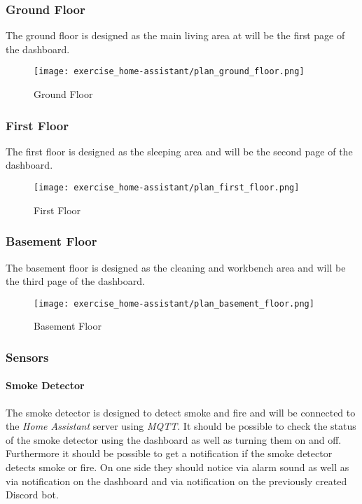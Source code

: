 \subsubsection{Ground Floor}
The ground floor is designed as the main living area at will be the first page of the dashboard.

\begin{figure}[H]
    \centering
    \texttt{[image: exercise\_home-assistant/plan\_ground\_floor.png]}
    \caption{Ground Floor}
    \label{fig:ground_floor}
\end{figure}

\subsubsection{First Floor}
The first floor is designed as the sleeping area and will be the second page of the dashboard.

\begin{figure}[H]
    \centering
    \texttt{[image: exercise\_home-assistant/plan\_first\_floor.png]}
    \caption{First Floor}
    \label{fig:first_floor}
\end{figure}

\subsubsection{Basement Floor}
The basement floor is designed as the cleaning and workbench area and will be the third page of the dashboard.

\begin{figure}[H]
    \centering
    \texttt{[image: exercise\_home-assistant/plan\_basement\_floor.png]}
    \caption{Basement Floor}
    \label{fig:basement_floor}
\end{figure}

\subsubsection{Sensors}

\paragraph{Smoke Detector}
The smoke detector is designed to detect smoke and fire and will be connected to the \textit{Home Assistant} server 
using \textit{MQTT}. It should be possible to check the status of the smoke detector using the dashboard as well as 
turning them on and off. Furthermore it should be possible to get a notification if the smoke detector detects smoke or 
fire. On one side they should notice via alarm sound as well as via notification on the dashboard and via notification 
on the previously created Discord bot.


